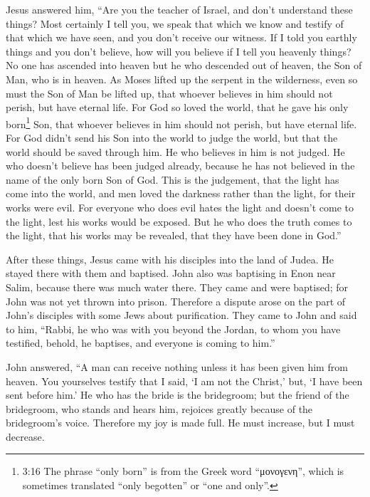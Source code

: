  Jesus answered him, ``Are you the teacher of Israel, and
don't understand these things?  Most certainly I tell you,
we speak that which we know and testify of that which we have seen, and
you don't receive our witness.  If I told you earthly
things and you don't believe, how will you believe if I tell you
heavenly things?  No one has ascended into heaven but he
who descended out of heaven, the Son of Man, who is in heaven.
 As Moses lifted up the serpent in the wilderness, even so
must the Son of Man be lifted up,  that whoever believes in
him should not perish, but have eternal life.  For God so
loved the world, that he gave his only born\footnote{3:16 The phrase
  ``only born'' is from the Greek word ``μονογενη'', which is sometimes
  translated ``only begotten'' or ``one and only''.} Son, that whoever
believes in him should not perish, but have eternal life. 
For God didn't send his Son into the world to judge the world, but that
the world should be saved through him.  He who believes in
him is not judged. He who doesn't believe has been judged already,
because he has not believed in the name of the only born Son of God.
 This is the judgement, that the light has come into the
world, and men loved the darkness rather than the light, for their works
were evil.  For everyone who does evil hates the light and
doesn't come to the light, lest his works would be exposed.
 But he who does the truth comes to the light, that his
works may be revealed, that they have been done in God.''

 After these things, Jesus came with his disciples into the
land of Judea. He stayed there with them and baptised. 
John also was baptising in Enon near Salim, because there was much water
there. They came and were baptised;  for John was not yet
thrown into prison.  Therefore a dispute arose on the part
of John's disciples with some Jews about purification. 
They came to John and said to him, ``Rabbi, he who was with you beyond
the Jordan, to whom you have testified, behold, he baptises, and
everyone is coming to him.''

 John answered, ``A man can receive nothing unless it has
been given him from heaven.  You yourselves testify that I
said, `I am not the Christ,' but, `I have been sent before him.'
 He who has the bride is the bridegroom; but the friend of
the bridegroom, who stands and hears him, rejoices greatly because of
the bridegroom's voice. Therefore my joy is made full.  He
must increase, but I must decrease.

